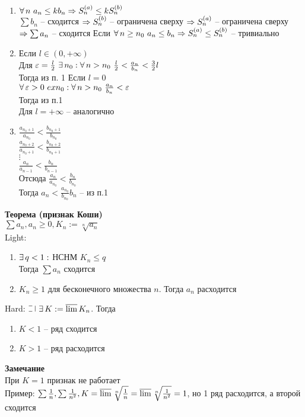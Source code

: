 \documentclass[12pt]{article}
\begin{document}
\begin{enumerate}
    \item $\forall\, n\ a_n \leq k b_n \Rightarrow S_n^{(a)} \leq k S_n^{(b)}$\\
    $\sum b_n$ -- сходится $\Rightarrow S_n^{(b)}$ -- ограничена сверху $\Rightarrow S_n^{(a)}$ -- ограничена сверху $\Rightarrow \sum a_n$ -- сходится
    Если $\forall\, n\geq n_0\ a_n \leq b_n \Rightarrow S_n^{(a)} \leq S_n^{(b)}$ -- тривиально
    \item Если $l \in (0, +\infty)$\\
    Для $\varepsilon =\frac l2\ \exists\, n_0: \forall\, n > n_0\ \frac l2 < \frac{a_n}{b_n} < \frac32 l$\\
    Тогда из п. 1
    Если $l = 0$\\
    $\fall \eps > 0\ ex n_0: \fall n > n_0\ \frac{a_n}{b_n} < \eps$\\
    Тогда из п.1\\
    Для $l=+\infty$ -- аналогично
    \item $\frac{a_{n_0+1}}{a_{n_0}} < \frac{b_{n_0+1}}{b_{n_0}}$\\
    $\frac{a_{n_0+2}}{a_{n_0+1}} < \frac{b_{n_0+2}}{b_{n_0+1}}$\\
    $\vdots$\\
    $\frac{a_n}{a_{n-1}} < \frac{b_n}{b_{n-1}}$\\
    Отсюда $\frac{a_n}{a_{n_0}} < \frac{b_n}{b_{n_0}}$\\
    Тогда $a_n < \frac{a_{n_0}}{b_{n_0}} b_n$ -- из п.1
\end{enumerate}
\textbf{Теорема (признак Коши)}\\
$\sum a_n, a_n \geq 0, K_n := \sqrt[n]{a_n}$\\
Light:\begin{enumerate}
    \item $\exists\, q < 1: $ НСНМ $K_n \leq q$\\
    Тогда $\sum a_n$ сходится
    \item $K_n \geq 1$ для бесконечного множества $n$. Тогда $a_n$ расходится
\end{enumerate}
Hard: $\letus\ \ex K:=\ulim K_n$. Тогда \begin{enumerate}
    \item $K < 1$ -- ряд сходится
    \item $K > 1$ -- ряд расходится
\end{enumerate}
\textbf{Замечание}\\
При $K=1$ признак не работает\\
Пример: $\sum\frac1n, \sum\frac1{n^2}, K = \operatorname*{\overline{lim}} \sqrt[n]{\frac1n} = \operatorname*{\overline{lim}} \sqrt[n]{\frac1{n^2}}=1$, но 1 ряд расходится, а второй сходится\\
\end{document}
